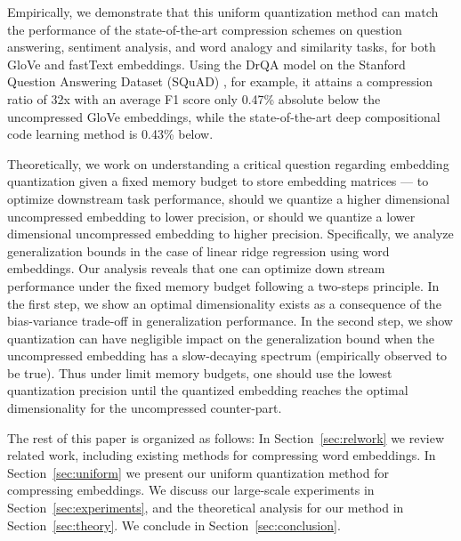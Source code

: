 Empirically, we demonstrate that this uniform quantization method can match the performance of the state-of-the-art compression schemes on question answering, sentiment analysis, and word analogy and similarity tasks, for both GloVe \citep{glove14} and fastText \citep{fasttext18} embeddings.
Using the DrQA model \citep{drqa17} on the Stanford Question Answering Dataset (SQuAD) \citep{squad16}, for example, it attains a compression ratio of 32x with an average F1 score only 0.47\% absolute below the uncompressed GloVe embeddings, while the state-of-the-art deep compositional code learning method \cite{dccl17} is 0.43\% below.

Theoretically, we work on understanding a critical question regarding embedding quantization given a fixed memory budget to store embedding matrices --- {to optimize downstream task performance, should we quantize a higher dimensional uncompressed embedding to lower precision, or should we quantize a lower dimensional uncompressed embedding to higher precision.} Specifically, we analyze generalization bounds in the case of linear ridge regression using word embeddings.
Our analysis reveals that one can optimize down stream performance under the fixed memory budget following a two-steps principle. In the first step, we show an optimal dimensionality exists as a consequence of the bias-variance trade-off in generalization performance. In the second step, we show quantization can have negligible impact on the generalization bound when the uncompressed embedding has a slow-decaying spectrum (empirically observed to be true). Thus under limit memory budgets, one should use the lowest quantization precision until the quantized embedding reaches the optimal dimensionality for the uncompressed counter-part. 

The rest of this paper is organized as follows:
In Section~\ref{sec:relwork} we review related work, including existing methods for compressing word embeddings.
In Section~\ref{sec:uniform} we present our uniform quantization method for compressing embeddings.
We discuss our large-scale experiments in Section~\ref{sec:experiments}, and the theoretical analysis for our method in Section~\ref{sec:theory}.
We conclude in Section~\ref{sec:conclusion}.




